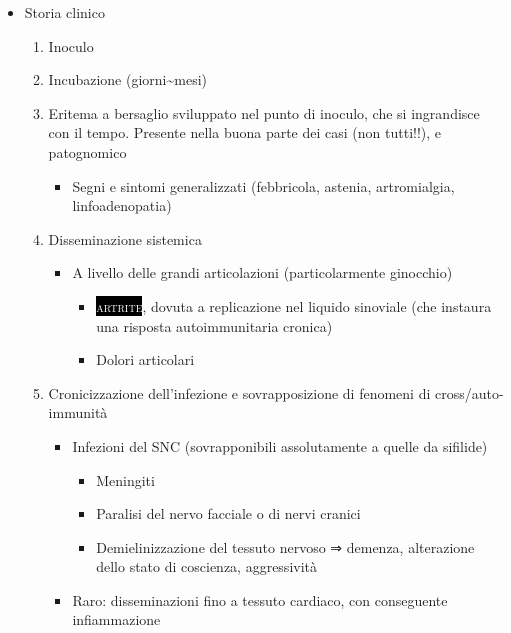 \documentclass[italian,]{article}
\providecommand{\tightlist}{%
  \setlength{\itemsep}{0pt}\setlength{\parskip}{0pt}}
\newcommand{\marginnote}[1]{\marginpar{\footnotesize← \emph{#1}}}
\newcommand{\pat}[1]{\colorbox{black}{\textcolor{white}{\textsc{#1}}}}
\begin{document}
\begin{itemize}
\tightlist
\item
  Storia clinico

  \begin{enumerate}
  \def\labelenumi{\arabic{enumi}.}
  \setcounter{enumi}{-1}
  \tightlist
  \item
    Inoculo
  \item
    Incubazione (giorni\textasciitilde{}mesi)
  \item
    Eritema a
    bersaglio sviluppato nel punto di inoculo, che si ingrandisce con il
    tempo. Presente nella buona parte dei casi (non tutti!!), e
    patognomico

    \begin{itemize}
    \tightlist
    \item
      Segni e sintomi generalizzati (febbricola, astenia, artromialgia,
      linfoadenopatia)
    \end{itemize}
  \item
    Disseminazione sistemica

    \begin{itemize}
    \tightlist
    \item
      A livello delle grandi articolazioni (particolarmente ginocchio)

      \begin{itemize}
      \tightlist
      \item
        \pat{artrite}, dovuta a replicazione nel liquido sinoviale (che
        instaura una risposta autoimmunitaria cronica)
      \item
        Dolori articolari
      \end{itemize}
    \end{itemize}
  \item
    Cronicizzazione dell'infezione e sovrapposizione di fenomeni di
    cross/auto-immunità

    \begin{itemize}
    \tightlist
    \item
      Infezioni del SNC (sovrapponibili assolutamente a quelle da
      sifilide) \marginnote{Tipico di \emph{B. garinii}}

      \begin{itemize}
      \tightlist
      \item
        Meningiti
      \item
        Paralisi del nervo facciale o di nervi cranici
      \item
        Demielinizzazione del tessuto nervoso ⇒ demenza, alterazione
        dello stato di coscienza, aggressività
      \end{itemize}
    \item
      Raro: disseminazioni fino a tessuto cardiaco, con conseguente
      infiammazione


\end{itemize}
\end{enumerate}
\end{itemize}
\end{document}
